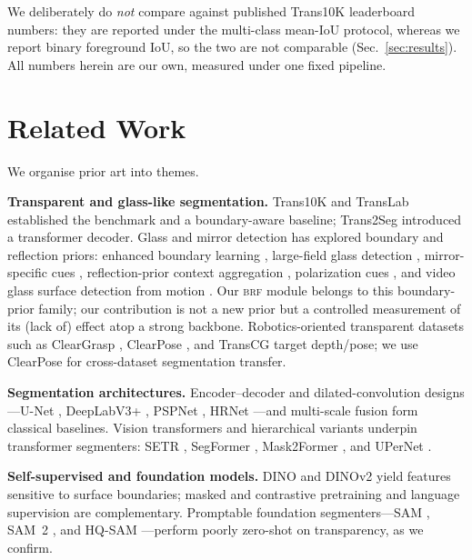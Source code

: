 \documentclass{article}
\newcommand{\brf}{\textsc{brf}}
\newcommand{\dinov}{DINOv2}
\newcommand{\iou}{IoU}
\begin{document}
We deliberately do \emph{not} compare against published Trans10K leaderboard
numbers: they are reported under the multi-class mean-\iou{} protocol, whereas we
report binary foreground \iou, so the two are not comparable
(Sec.~\ref{sec:results}). All numbers herein are our own, measured under one
fixed pipeline.

\section{Related Work}
We organise prior art into themes.

\textbf{Transparent and glass-like segmentation.} Trans10K and TransLab
\cite{xie2020translab} established the benchmark and a boundary-aware baseline;
Trans2Seg \cite{xie2021trans2seg} introduced a transformer decoder. Glass and
mirror detection has explored boundary and reflection priors: enhanced boundary
learning \cite{he2021eblnet}, large-field glass detection \cite{mei2020gdnet},
mirror-specific cues \cite{yang2019mirrornet}, reflection-prior context
aggregation \cite{lin2021gsd}, polarization cues
\cite{mei2022polarization}, and video glass surface detection from motion
\cite{liu2024vgsd}. Our \brf{} module belongs to this boundary-prior
family; our contribution is not a new prior but a controlled measurement of its
(lack of) effect atop a strong backbone. Robotics-oriented transparent datasets
such as ClearGrasp \cite{sajjan2020cleargrasp}, ClearPose
\cite{chen2022clearpose}, and TransCG \cite{fang2022transcg} target depth/pose;
we use ClearPose for cross-dataset segmentation transfer.

\textbf{Segmentation architectures.} Encoder--decoder and dilated-convolution
designs---U-Net \cite{ronneberger2015unet}, DeepLabV3+
\cite{chen2018deeplabv3plus}, PSPNet \cite{zhao2017pspnet}, HRNet
\cite{wang2020hrnet}---and multi-scale fusion \cite{lin2017fpn} form classical
baselines. Vision transformers \cite{dosovitskiy2021vit} and hierarchical
variants \cite{liu2021swin} underpin transformer segmenters: SETR
\cite{zheng2021setr}, SegFormer \cite{xie2021segformer}, Mask2Former
\cite{cheng2022mask2former}, and UPerNet \cite{xiao2018upernet}.

\textbf{Self-supervised and foundation models.} DINO \cite{caron2021dino} and
\dinov{} \cite{oquab2023dinov2} yield features sensitive to surface boundaries;
masked \cite{he2022mae} and contrastive \cite{he2020moco} pretraining and
language supervision \cite{radford2021clip} are complementary. Promptable
foundation segmenters---SAM \cite{kirillov2023sam}, SAM~2
\cite{ravi2024sam2}, and HQ-SAM \cite{ke2023hqsam}---perform poorly zero-shot on
transparency, as we confirm.
\end{document}
